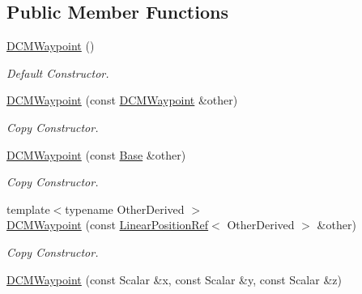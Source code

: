 \subsection*{Public Member Functions}
\begin{DoxyCompactItemize}
\item 
\hyperlink{classow__core_1_1DCMWaypoint_acaa3bae7a4dd9b78115b868268ae6edb}{D\+C\+M\+Waypoint} ()\hypertarget{classow__core_1_1DCMWaypoint_acaa3bae7a4dd9b78115b868268ae6edb}{}\label{classow__core_1_1DCMWaypoint_acaa3bae7a4dd9b78115b868268ae6edb}

\begin{DoxyCompactList}\small\item\em Default Constructor. \end{DoxyCompactList}\item 
\hyperlink{classow__core_1_1DCMWaypoint_add4f3777fcc0e943c6696cd6e1065a50}{D\+C\+M\+Waypoint} (const \hyperlink{classow__core_1_1DCMWaypoint}{D\+C\+M\+Waypoint} \&other)\hypertarget{classow__core_1_1DCMWaypoint_add4f3777fcc0e943c6696cd6e1065a50}{}\label{classow__core_1_1DCMWaypoint_add4f3777fcc0e943c6696cd6e1065a50}

\begin{DoxyCompactList}\small\item\em Copy Constructor. \end{DoxyCompactList}\item 
\hyperlink{classow__core_1_1DCMWaypoint_abe9c5eb6bac937484ad36ebd9ff1eb45}{D\+C\+M\+Waypoint} (const \hyperlink{classow__core_1_1LinearPosition}{Base} \&other)\hypertarget{classow__core_1_1DCMWaypoint_abe9c5eb6bac937484ad36ebd9ff1eb45}{}\label{classow__core_1_1DCMWaypoint_abe9c5eb6bac937484ad36ebd9ff1eb45}

\begin{DoxyCompactList}\small\item\em Copy Constructor. \end{DoxyCompactList}\item 
{\footnotesize template$<$typename Other\+Derived $>$ }\\\hyperlink{classow__core_1_1DCMWaypoint_a9d94fcee97c5da77de540f66325174c2}{D\+C\+M\+Waypoint} (const \hyperlink{classow__core_1_1LinearPositionRef}{Linear\+Position\+Ref}$<$ Other\+Derived $>$ \&other)\hypertarget{classow__core_1_1DCMWaypoint_a9d94fcee97c5da77de540f66325174c2}{}\label{classow__core_1_1DCMWaypoint_a9d94fcee97c5da77de540f66325174c2}

\begin{DoxyCompactList}\small\item\em Copy Constructor. \end{DoxyCompactList}\item 
\hyperlink{classow__core_1_1DCMWaypoint_a560f9088f44df98aa1da1dd188fc3fff}{D\+C\+M\+Waypoint} (const Scalar \&x, const Scalar \&y, const Scalar \&z)\hypertarget{classow__core_1_1DCMWaypoint_a560f9088f44df98aa1da1dd188fc3fff}{}\label{classow__core_1_1DCMWaypoint_a560f9088f44df98aa1da1dd188fc3fff}


\end{DoxyCompactItemize}
